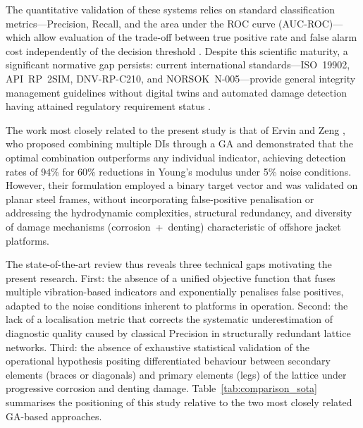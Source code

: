 \documentclass[a4paper,fleqn,nologo]{cas-dc}
\begin{document}
The quantitative validation of these systems relies on standard classification metrics---Precision, Recall, and the area under the ROC curve (AUC-ROC)---which allow evaluation of the trade-off between true positive rate and false alarm cost independently of the decision threshold \citep{li2024reliability}. Despite this scientific maturity, a significant normative gap persists: current international standards---ISO~19902, API~RP~2SIM, DNV-RP-C210, and NORSOK~N-005---provide general integrity management guidelines without digital twins and automated damage detection having attained regulatory requirement status \citep{ramboll2022digital}.

The work most closely related to the present study is that of Ervin and Zeng \citep{ervin2022index}, who proposed combining multiple DIs through a GA and demonstrated that the optimal combination outperforms any individual indicator, achieving detection rates of 94\% for 60\% reductions in Young's modulus under 5\% noise conditions. However, their formulation employed a binary target vector and was validated on planar steel frames, without incorporating false-positive penalisation or addressing the hydrodynamic complexities, structural redundancy, and diversity of damage mechanisms (corrosion~+~denting) characteristic of offshore jacket platforms.

The state-of-the-art review thus reveals three technical gaps motivating the present research. First: the absence of a unified objective function that fuses multiple vibration-based indicators and exponentially penalises false positives, adapted to the noise conditions inherent to platforms in operation. Second: the lack of a localisation metric that corrects the systematic underestimation of diagnostic quality caused by classical Precision in structurally redundant lattice networks. Third: the absence of exhaustive statistical validation of the operational hypothesis positing differentiated behaviour between secondary elements (braces or diagonals) and primary elements (legs) of the lattice under progressive corrosion and denting damage. Table~\ref{tab:comparison_sota} summarises the positioning of this study relative to the two most closely related GA-based approaches.
\end{document}
